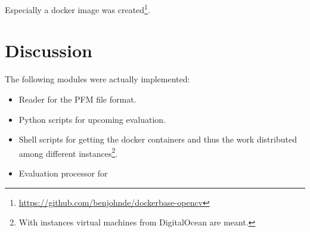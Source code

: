 \noindent Especially a docker image was created\footnote{\url{https://github.com/benjohnde/dockerbase-opencv}}.

\section{Discussion}

The following modules were actually implemented:

\begin{itemize}
  \item Reader for the PFM file format.
  \item Python scripts for upcoming evaluation.
  \item Shell scripts for getting the docker containers and thus the work distributed among different instances\footnote{With instances virtual machines from DigitalOcean are meant.}.
  \item Evaluation processor for
\end{itemize}
